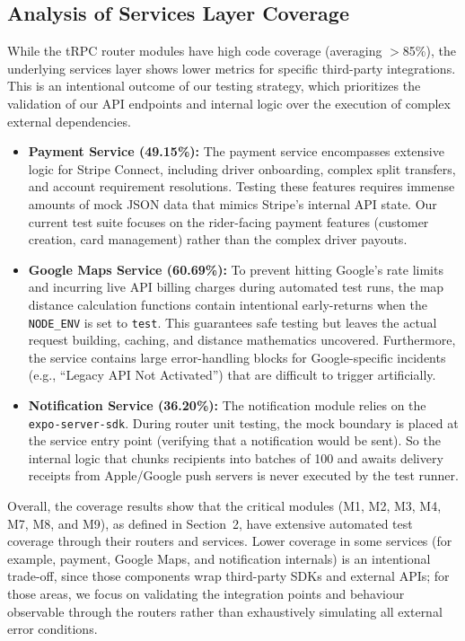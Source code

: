\subsection*{Analysis of Services Layer Coverage}
While the tRPC router modules have high code coverage (averaging $>$85\%), the underlying services layer shows lower metrics for specific third-party integrations. This is an intentional outcome of our testing strategy, which prioritizes the validation of our API endpoints and internal logic over the execution of complex external dependencies.

\begin{itemize}
    \item \textbf{Payment Service (49.15\%):} The payment service encompasses extensive logic for Stripe Connect, including driver onboarding, complex split transfers, and account requirement resolutions. Testing these features requires immense amounts of mock JSON data that mimics Stripe's internal API state. Our current test suite focuses on the rider-facing payment features (customer creation, card management) rather than the complex driver payouts.
    \item \textbf{Google Maps Service (60.69\%):} To prevent hitting Google's rate limits and incurring live API billing charges during automated test runs, the map distance calculation functions contain intentional early-returns when the \texttt{NODE\_ENV} is set to \texttt{test}. This guarantees safe testing but leaves the actual request building, caching, and distance mathematics uncovered. Furthermore, the service contains large error-handling blocks for Google-specific incidents (e.g., ``Legacy API Not Activated'') that are difficult to trigger artificially.
    \item \textbf{Notification Service (36.20\%):} The notification module relies on the \texttt{expo-server-sdk}. During router unit testing, the mock boundary is placed at the service entry point (verifying that a notification would be sent). So the internal logic that chunks recipients into batches of 100 and awaits delivery receipts from Apple/Google push servers is never executed by the test runner.
\end{itemize}

Overall, the coverage results show that the critical modules (M1, M2, M3, M4, M7, M8, and M9), as defined in Section~2, have extensive automated test coverage through their routers and services. Lower coverage in some services (for example, payment, Google Maps, and notification internals) is an intentional trade-off, since those components wrap third-party SDKs and external APIs; for those areas, we focus on validating the integration points and behaviour observable through the routers rather than exhaustively simulating all external error conditions.
